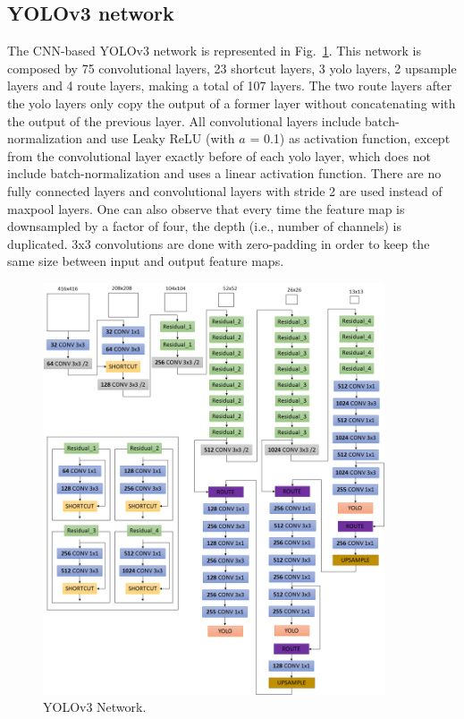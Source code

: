 \subsection{YOLOv3 network}

The CNN-based YOLOv3 network is represented in Fig.~\ref{fig:yolov3_ntw}. This network is composed by 75 convolutional layers, 23 shortcut layers, 3 yolo layers, 2 upsample layers and 4 route layers, making a total of 107 layers. The two route layers after the yolo layers only copy the output of a former layer without concatenating with the output of the previous layer. All convolutional layers include batch-normalization and use Leaky ReLU (with $a$ = 0.1) as activation function, except from the convolutional layer exactly before of each yolo layer, which does not include batch-normalization and uses a linear activation function. There are no fully connected layers and convolutional layers with stride 2 are used instead of maxpool layers. One can also observe that every time the feature map is downsampled by a factor of four, the depth (i.e., number of channels) is duplicated. 3x3 convolutions are done with zero-padding in order to keep the same size between input and output feature maps.

\begin{figure}[!htb]
  \centering
  \includegraphics[width=0.9\textwidth]{Figures/yolov3_ntw.png}
  \caption{YOLOv3 Network.}
  \label{fig:yolov3_ntw}
\end{figure}

